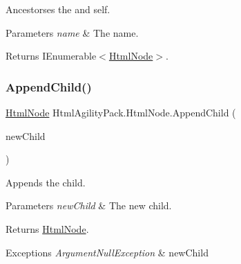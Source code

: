 Ancestorses the and self. 


\begin{DoxyParams}{Parameters}
{\em name} & The name.\\
\hline
\end{DoxyParams}
\begin{DoxyReturn}{Returns}
I\+Enumerable$<$\hyperlink{class_html_agility_pack_1_1_html_node}{Html\+Node}$>$.
\end{DoxyReturn}
\mbox{\label{class_html_agility_pack_1_1_html_node_af917eeb066983ef0519461c056efcef2}} 
\subsubsection{\texorpdfstring{Append\+Child()}{AppendChild()}}
{\footnotesize\ttfamily \hyperlink{class_html_agility_pack_1_1_html_node}{Html\+Node} Html\+Agility\+Pack.\+Html\+Node.\+Append\+Child (\begin{DoxyParamCaption}\item[{\hyperlink{class_html_agility_pack_1_1_html_node}{Html\+Node}}]{new\+Child }\end{DoxyParamCaption})\hspace{0.3cm}{\ttfamily [inline]}}



Appends the child. 


\begin{DoxyParams}{Parameters}
{\em new\+Child} & The new child.\\
\hline
\end{DoxyParams}
\begin{DoxyReturn}{Returns}
\hyperlink{class_html_agility_pack_1_1_html_node}{Html\+Node}.
\end{DoxyReturn}

\begin{DoxyExceptions}{Exceptions}
{\em Argument\+Null\+Exception} & new\+Child\\
\hline
\end{DoxyExceptions}
\mbox{\label{class_html_agility_pack_1_1_html_node_a4e519d2b6aa2103cf215c7f87c26afec}} 
